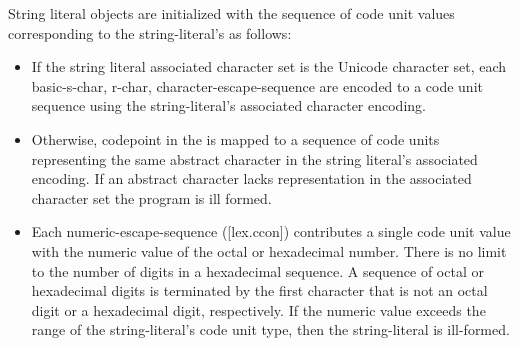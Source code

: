 \documentclass{wg21}
\begin{document}
\begin{addedblock}
String literal objects are initialized with the sequence of code unit values corresponding to the string-literal's as follows:
\begin{itemize}
\item If the string literal associated character set is the Unicode character set, each basic-s-char, r-char, character-escape-sequence are encoded to a code unit sequence using the string-literal's associated character encoding.
\item Otherwise, codepoint in the  is mapped to a sequence of code units representing the same abstract character in the string literal's associated encoding. If an abstract character lacks representation in the associated character set the program is ill formed.  

\item Each numeric-escape-sequence ([lex.ccon]) contributes a single code unit value with the numeric value of the octal or hexadecimal number. There is no limit to the number of digits in a hexadecimal sequence. A sequence of octal or hexadecimal digits is terminated by the first character that is not an octal digit or a hexadecimal digit, respectively. If the numeric value exceeds the range of the string-literal's code unit type, then the string-literal is ill-formed.
\end{itemize}

\end{addedblock}
\end{document}
